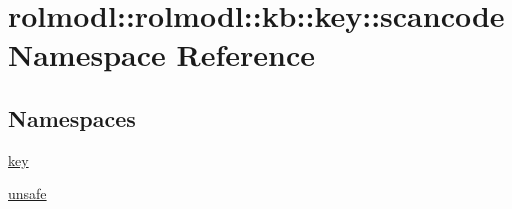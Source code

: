 \hypertarget{namespacerolmodl_1_1rolmodl_1_1kb_1_1key_1_1scancode}{}\section{rolmodl\+::rolmodl\+::kb\+::key\+::scancode Namespace Reference}
\label{namespacerolmodl_1_1rolmodl_1_1kb_1_1key_1_1scancode}
\subsection*{Namespaces}
\begin{DoxyCompactItemize}
\item 
 \mbox{\hyperlink{namespacerolmodl_1_1rolmodl_1_1kb_1_1key_1_1scancode_1_1key}{key}}
\item 
 \mbox{\hyperlink{namespacerolmodl_1_1rolmodl_1_1kb_1_1key_1_1scancode_1_1unsafe}{unsafe}}
\end{DoxyCompactItemize}
